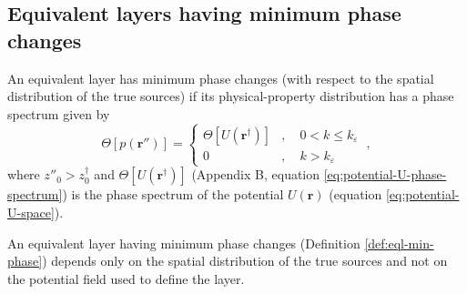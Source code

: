 \subsection{Equivalent layers having minimum phase changes}

\begin{definition}
	An equivalent layer has minimum phase changes (with respect to the spatial distribution of the true sources) if its
	physical-property distribution has a phase spectrum given by 
	\begin{equation}
		\Theta [ p(\mathbf{r}'') ] = \begin{cases}
			\Theta [ U(\mathbf{r}^{\dagger}) ] & , \quad 0 < k \le k_{\varepsilon} \\
			0 & , \quad k > k_{\varepsilon}
		\end{cases} \: ,
		\label{eq:p-phase-spectrum-U}
	\end{equation}
	where $z''_{0} > z^{\dagger}_{0}$ and $\Theta [ U(\mathbf{r}^{\dagger}) ]$ (Appendix B, equation \ref{eq:potential-U-phase-spectrum})
	is the phase spectrum of the potential $U(\mathbf{r})$ (equation \ref{eq:potential-U-space}).
	\label{def:eql-min-phase}
\end{definition}
\begin{corollary}
	\label{corollary:minimum-phase-change-layers}
	An equivalent layer having minimum phase changes (Definition \ref{def:eql-min-phase})
	depends only on the spatial distribution of the true sources and not on the potential field
	used to define the layer.
\end{corollary}
